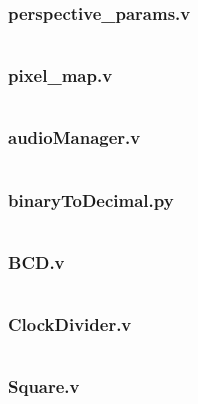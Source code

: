\documentclass{article}
\begin{document}
\subsubsection{perspective\_params.v}
\inputminted[linenos]{verilog}{../../src/perspective_params.v}
\subsubsection{pixel\_map.v}
\inputminted[linenos]{verilog}{../../src/pixel_map.v}
\subsubsection{audioManager.v}
\inputminted[linenos]{verilog}{../../src/audioManager.v}
\subsubsection{binaryToDecimal.py}
\inputminted[linenos]{python}{../../assets/binaryToDecimal.py}
\subsubsection{BCD.v}
\inputminted[linenos]{verilog}{../../src/BCD.v}
\subsubsection{ClockDivider.v}
\inputminted[linenos]{verilog}{../../src/ClockDivider.v}
\subsubsection{Square.v}
\inputminted[linenos]{verilog}{../../src/Square.v}
\end{document}
